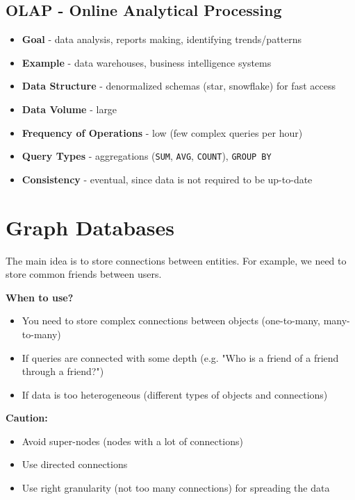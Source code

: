 \documentclass{article}
\newcommand{\code}[1]{\colorbox{light-gray}{\texttt{#1}}}
\begin{document}
\subsection{OLAP - Online Analytical Processing}
\noindent

\begin{itemize}
  \item \textbf{Goal} - data analysis, reports making, identifying trends/patterns
  \item \textbf{Example} - data warehouses, business intelligence systems
  \item \textbf{Data Structure} - denormalized schemas (star, snowflake) for fast access
  \item \textbf{Data Volume} - large
  \item \textbf{Frequency of Operations} - low (few complex queries per hour)
  \item \textbf{Query Types} - aggregations (\code{SUM}, \code{AVG}, \code{COUNT}), \code{GROUP BY}
  \item \textbf{Consistency} - eventual, since data is not required to be up-to-date
\end{itemize}

\section{Graph Databases}
\noindent

The main idea is to store connections between entities. For example, we need to store common friends between users.

\textbf{When to use?} 

\begin{itemize}
  \item You need to store complex connections between objects (one-to-many, many-to-many)
  \item If queries are connected with some depth (e.g. "Who is a friend of a friend through a friend?")
  \item If data is too heterogeneous (different types of objects and connections)
\end{itemize}

\textbf{Caution:} 

\begin{itemize}
  \item Avoid super-nodes (nodes with a lot of connections)
  \item Use directed connections
  \item Use right granularity (not too many connections) for spreading the data
\end{itemize}
\end{document}
